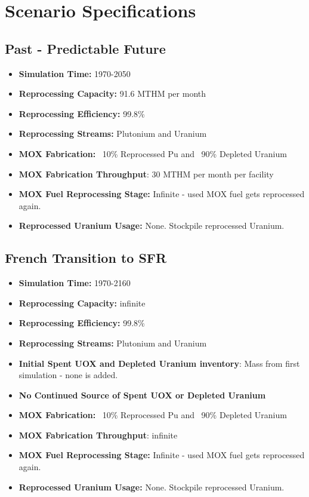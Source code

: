 \section{Scenario Specifications}

\subsection{Past - Predictable Future}
\begin{itemize}
	\item \textbf{Simulation Time:}  1970-2050 
	\item \textbf{Reprocessing Capacity:}  91.6 MTHM per month \cite{schneider_spent_2008}  
	\item \textbf{Reprocessing Efficiency:}  99.8\%  
	\item \textbf{Reprocessing Streams:}  Plutonium and Uranium  
	\item \textbf{\gls{MOX} Fabrication:}  ~10\% Reprocessed Pu and ~90\% Depleted Uranium  
	\item \textbf{\gls{MOX} Fabrication Throughput}: 30 MTHM per month per facility \cite{hugelmann_melox_1999}
	\item \textbf{\gls{MOX} Fuel Reprocessing Stage:}  Infinite - used \gls{MOX} fuel gets reprocessed again.  
	\item\textbf{Reprocessed Uranium Usage:}  None. Stockpile reprocessed Uranium. \\
\end{itemize}

\subsection{French Transition to \gls{SFR}}
\begin{itemize}
	\item \textbf{Simulation Time:}  1970-2160
	\item \textbf{Reprocessing Capacity:}  infinite 
	\item \textbf{Reprocessing Efficiency:}  99.8\%  
	\item \textbf{Reprocessing Streams:} Plutonium and Uranium
	\item \textbf{Initial Spent \gls{UOX} and Depleted Uranium inventory}: Mass from first simulation - none is added.
	\item \textbf{No Continued Source of Spent \gls{UOX} or Depleted Uranium}  
	\item \textbf{\gls{MOX} Fabrication:}  ~10\% Reprocessed Pu and ~90\% Depleted Uranium  
	\item \textbf{\gls{MOX} Fabrication Throughput}: infinite
	\item \textbf{\gls{MOX} Fuel Reprocessing Stage:}  Infinite - used \gls{MOX} fuel gets reprocessed again.  
	\item\textbf{Reprocessed Uranium Usage:}  None. Stockpile reprocessed Uranium. \\
\end{itemize}

